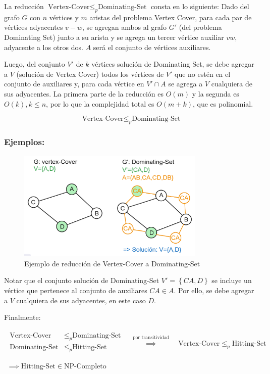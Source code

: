 La reducción $\text{Vertex-Cover} \leq _{p} \text{Dominating-Set}$ consta en lo siguiente:
Dado del grafo $G$ con $n$ vértices y $m$ aristas del problema Vertex Cover, para cada par de 
vértices adyacentes $v-w$, se agregan ambos al grafo $G'$ (del problema Dominating Set) junto a 
su arista y se agrega un tercer vértice auxiliar $vw$, adyacente a los otros dos. $A$ será el 
conjunto de vértices auxiliares. 

Luego, del conjunto $V'$ de $k$ vértices solución de Dominating Set, se debe agregar a $V$ (solución de Vertex Cover) todos los vértices de $V'$ que no estén en el conjunto de auxiliares y, para cada vértice en $V' \cap A$ se agrega a $V$  cualquiera de sus adyacentes. La primera parte de la reducción es $O(m)$ y la segunda es $O(k),k \leq n$, por lo que la complejidad total es $O(m+k)$, que es polinomial.

\[\text{Vertex-Cover} \leq _{p} \text{Dominating-Set}\]

\subsubsection{Ejemplos:} 
\begin{figure}[H]
    \centering
    \includegraphics[width=0.8\textwidth]{img/ejemplo1_VC-DS.png}
    \caption{Ejemplo de reducción de Vertex-Cover a Dominating-Set}
    \label{fig:ejemplo1_VC-DS}
\end{figure}

Notar que el conjunto solución de Dominating-Set $V'=\left\{CA,D\right\}$ se incluye un vértice que pertenece al conjunto de auxiliares $CA \in A$. Por ello, se debe agregar a $V$ cualquiera de sus adyacentes, en este caso $D$.

Finalmente:

\[
    \begin{array}{c}
        \begin{split}
            \text{Vertex-Cover}  & \leq _{p} \text{Dominating-Set} \\
            \text{Dominating-Set}  & \leq _{p} \text{Hitting-Set} \\
        \end{split}
        \quad \overset{ \text{por transitividad} }{ \implies  } \quad
        \text{Vertex-Cover}  \leq _{p} \text{Hitting-Set} \\ \\
        \implies \text{Hitting-Set} \in \text{NP-Completo}    
    \end{array}
\]

